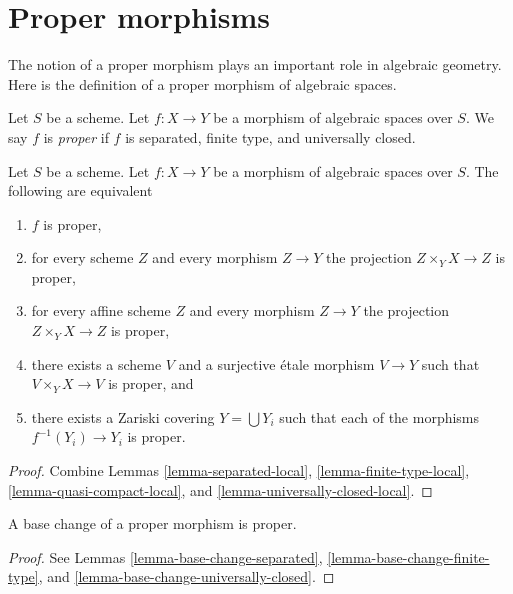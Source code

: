 \section{Proper morphisms}
\label{section-proper}

\noindent
The notion of a proper morphism plays an important role in algebraic geometry.
Here is the definition of a proper morphism of algebraic spaces.

\begin{definition}
\label{definition-proper}
Let $S$ be a scheme.
Let $f : X \to Y$ be a morphism of algebraic spaces over $S$.
We say $f$ is {\it proper} if $f$ is separated, finite type, and
universally closed.
\end{definition}

\begin{lemma}
\label{lemma-proper-local}
Let $S$ be a scheme. Let $f : X \to Y$ be a morphism of algebraic spaces
over $S$. The following are equivalent
\begin{enumerate}
\item $f$ is proper,
\item for every scheme $Z$ and every morphism $Z \to Y$
the projection $Z \times_Y X \to Z$ is proper,
\item for every affine scheme $Z$ and every morphism $Z \to Y$
the projection $Z \times_Y X \to Z$ is proper,
\item there exists a scheme $V$ and a surjective \'etale morphism
$V \to Y$ such that $V \times_Y X \to V$ is proper, and
\item there exists a Zariski covering $Y = \bigcup Y_i$ such that
each of the morphisms $f^{-1}(Y_i) \to Y_i$ is proper.
\end{enumerate}
\end{lemma}

\begin{proof}
Combine Lemmas \ref{lemma-separated-local},
\ref{lemma-finite-type-local},
\ref{lemma-quasi-compact-local}, and
\ref{lemma-universally-closed-local}.
\end{proof}

\begin{lemma}
\label{lemma-base-change-proper}
A base change of a proper morphism is proper.
\end{lemma}

\begin{proof}
See
Lemmas \ref{lemma-base-change-separated},
\ref{lemma-base-change-finite-type}, and
\ref{lemma-base-change-universally-closed}.
\end{proof}

